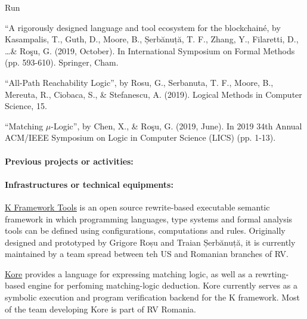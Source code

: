 \begin{sitedescription}{Run}
\begin{compactitem}
\item ``A rigorously designed language and tool ecosystem for the blockchainé, by Kasampalis, T., Guth, D., Moore, B., Șerbănuță, T. F., Zhang, Y., Filaretti, D., \ldots \& Roşu, G. (2019, October). In International Symposium on Formal Methods (pp. 593-610). Springer, Cham.
\item ``All-Path Reachability Logic'', by Rosu, G., Serbanuta, T. F., Moore, B., Mereuta, R., Ciobaca, S., \& Stefanescu, A. (2019). Logical Methods in Computer Science, 15.
\item ``Matching $\mu$-Logic'', by Chen, X., \& Roşu, G. (2019, June). In 2019 34th Annual ACM/IEEE Symposium on Logic in Computer Science (LICS) (pp. 1-13).
\end{compactitem}

\paragraph*{Previous projects or activities:}


\begin{compactitem}
\item 
\end{compactitem}

\paragraph*{Infrastructures or technical equipments:}


\begin{compactitem}
\item \href{https://github.com/kframework/k}{K Framework Tools} is an open source
 rewrite-based executable semantic framework in which programming languages,
 type systems and formal analysis tools can be defined using configurations,
 computations and rules. Originally designed and prototyped by Grigore Roșu and 
 Traian Șerbănuță, it is currently maintained by a team spread between teh US and 
 Romanian branches of RV. 
\item \href{https://github.com/kframework/kore}{Kore} provides a language for
expressing matching logic, as well as a rewrting-based engine for perfoming 
matching-logic deduction.  Kore currently serves as a symbolic execution and 
program verification backend for the K framework. Most of the team developing Kore
is part of RV Romania.
\end{compactitem}


\end{sitedescription}
